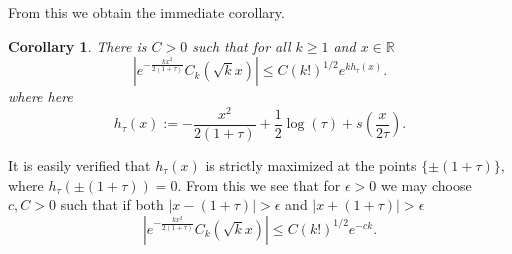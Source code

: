 \documentclass[12pt]{article}
\newcommand{\R}{\mathbb{R}}
\newtheorem{corr}[info]{Corollary}
\numberwithin{info}{section}
\numberwithin{equation}{section}
\renewcommand{\[}{\begin{equation}}
\renewcommand{\]}{\end{equation}}
\newcommand{\sq}{\sqrt}
\newcommand{\<}{\langle}
\renewcommand{\>}{\rangle}
\renewcommand{\sq}{\sqrt}
\begin{document}
	From this we obtain the immediate corollary.
	
	\begin{corr}
		\label{corr:technical:orthogonal polynomial upper bound}
		There is $C>0$ such that for all $k\ge 1$ and $x\in \R$
		\[|e^{-\frac{kx^2}{2(1+\tau)}}C_k(\sq{k}x)|\le C (k!)^{1/2}e^{k h_\tau(x)}.\label{eqn:ignore-204}\]
		where here
		\[h_\tau(x):=-\frac{x^2}{2(1+\tau)}+\frac{1}{2}\log(\tau)+s\left(\frac{x}{2\tau}\right).\]
	\end{corr}
	
	It is easily verified that $h_\tau(x)$ is strictly maximized at the points $\{\pm(1+\tau)\}$, where $h_\tau(\pm(1+\tau))=0$. From this we see that for $\epsilon>0$ we may choose $c,C>0$ such that if both $|x-(1+\tau)|>\epsilon$ and $|x+(1+\tau)|>\epsilon$
	\[|e^{-\frac{kx^2}{2(1+\tau)}}C_k(\sq{k}x)|\le C (k!)^{1/2}e^{-ck}.\label{eqn:ignore-214}\]	
	
\end{document}
